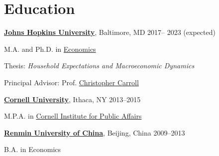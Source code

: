 
\section{Education}
\href{https://www.jhu.edu}{\textbf{Johns Hopkins University}}, Baltimore, MD \hfill 2017-- 2023 (expected)
\begin{outerlist}
	\item M.A. and Ph.D.  in \href{https://econ.jhu.edu} {Economics}
	 \item Thesis: \textit{Household Expectations and Macroeconomic Dynamics}
	  {\item Principal Advisor: Prof. \href{https://econ.jhu.edu/directory/christopher-carroll/}{Christopher Carroll} 
	}
\end{outerlist}
\vspace{0.1in}
\href{http://cornell.edu}{\textbf{Cornell University}}, Ithaca, NY \hfill 2013--2015
\begin{outerlist}
	\item M.P.A. in \href{https://www.human.cornell.edu/cipa}{Cornell Institute for Public Affairs} 
\end{outerlist}

\vspace{0.1in}
\href{https://www.ruc.edu.cn/en}{\textbf{Renmin University of China}}, Beijing, China \hfill 2009--2013
\begin{outerlist}
	\item B.A. in Economics 
\end{outerlist}

